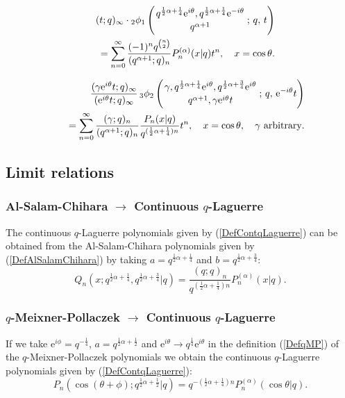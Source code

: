 \documentclass[envcountchap,graybox]{svmono}
\newcounter{rom}
\newcommand{\qhyp}[5]{\mbox{}_{#1}{\phi}_{#2}
\left(\genfrac{}{}{0pt}{}{#3}{#4}\,;\,q,\,#5\right)}
\newcommand{\e}{\textrm{e}}
\begin{document}
\begin{eqnarray}
\label{GenContqLaguerre3}
& &(t;q)_{\infty}\cdot\qhyp{2}{1}{q^{\frac{1}{2}\alpha+\frac{1}{4}}\e^{i\theta},
q^{\frac{1}{2}\alpha+\frac{1}{4}}\e^{-i\theta}}{q^{\alpha+1}}{t}\nonumber\\
& &{}=\sum_{n=0}^{\infty}\frac{(-1)^nq^{\binom{n}{2}}}{(q^{\alpha+1};q)_n}
P_n^{(\alpha)}(x|q)t^n,\quad x=\cos\theta.
\end{eqnarray}

\begin{eqnarray}
\label{GenContqLaguerre4}
& &\frac{(\gamma\e^{i\theta}t;q)_{\infty}}{(\e^{i\theta}t;q)_{\infty}}\,
\qhyp{3}{2}{\gamma,q^{\frac{1}{2}\alpha+\frac{1}{4}}\e^{i\theta},q^{\frac{1}{2}\alpha+\frac{3}{4}}\e^{i\theta}}{q^{\alpha+1},\gamma\e^{i\theta}t}{\e^{-i\theta}t}\nonumber\\
& &{}=\sum_{n=0}^{\infty}\frac{(\gamma;q)_n}{(q^{\alpha+1};q)_n}\frac{P_n(x|q)}{q^{(\frac{1}{2}\alpha+\frac{1}{4})n}}t^n,
\quad x=\cos\theta,\quad\textrm{$\gamma$ arbitrary}.
\end{eqnarray}

\subsection*{Limit relations}

\subsubsection*{Al-Salam-Chihara $\rightarrow$ Continuous $q$-Laguerre}
The continuous $q$-Laguerre polynomials given by (\ref{DefContqLaguerre})
can be obtained from the Al-Salam-Chihara polynomials given by
(\ref{DefAlSalamChihara}) by taking $a=q^{\frac{1}{2}\alpha+\frac{1}{4}}$ and
$b=q^{\frac{1}{2}\alpha+\frac{3}{4}}$:
$$Q_n(x;q^{\frac{1}{2}\alpha+\frac{1}{4}},q^{\frac{1}{2}\alpha+\frac{3}{4}}|q)
=\frac{(q;q)_n}{q^{(\frac{1}{2}\alpha+\frac{1}{4})n}}P_n^{(\alpha)}(x|q).$$

\subsubsection*{$q$-Meixner-Pollaczek $\rightarrow$ Continuous $q$-Laguerre}
If we take $\e^{i\phi}=q^{-\frac{1}{4}}$, $a=q^{\frac{1}{2}\alpha+\frac{1}{2}}$
and $\e^{i\theta}\rightarrow q^{\frac{1}{4}}\e^{i\theta}$ in the definition
(\ref{DefqMP}) of the $q$-Meixner-Pollaczek polynomials we obtain the
continuous $q$-Laguerre polynomials given by (\ref{DefContqLaguerre}):
$$P_n(\cos(\theta+\phi);q^{\frac{1}{2}\alpha+\frac{1}{2}}|q)=
q^{-(\frac{1}{2}\alpha+\frac{1}{4})n}P_n^{(\alpha)}(\cos\theta|q).$$
\end{document}
